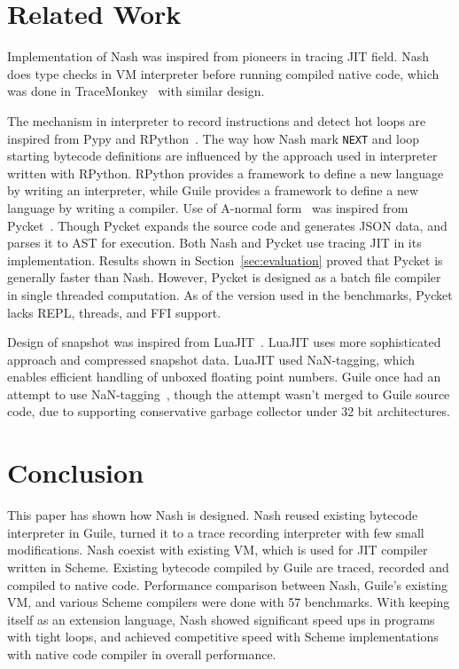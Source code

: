 \documentclass[preprint, 10pt]{sigplanconf}
\begin{document}
\section{Related Work}
\label{sec:related}
Implementation of Nash was inspired from pioneers in tracing JIT field. Nash
does type checks in VM interpreter before running compiled native code, which
was done in TraceMonkey~\cite{gal2009trace} with similar design.

The mechanism in interpreter to record instructions and detect hot loops are
inspired from Pypy and RPython~\cite{bolz2009tracing}. The way how Nash mark
\texttt{NEXT} and loop starting bytecode definitions are influenced by the
approach used in interpreter written with RPython.  RPython provides a
framework to define a new language by writing an interpreter, while Guile
provides a framework to define a new language by writing a compiler.  Use of
A-normal form~\cite{flanagan1993essence} was inspired from
Pycket~\cite{bauman2015pycket}. Though Pycket expands the source code and
generates JSON data, and parses it to AST for execution. Both Nash and Pycket
use tracing JIT in its implementation. Results shown in
Section~\ref{sec:evaluation} proved that Pycket is generally faster than Nash.
However, Pycket is designed as a batch file compiler in single threaded
computation. As of the version used in the benchmarks, Pycket lacks REPL,
threads, and FFI support.

Design of snapshot was inspired from LuaJIT~\cite{pall2009ip}. LuaJIT uses
more sophisticated approach and compressed snapshot data. LuaJIT used
NaN-tagging, which enables efficient handling of unboxed floating point
numbers. Guile once had an attempt to use NaN-tagging~\cite{wingo2011value},
though the attempt wasn't merged to Guile source code, due to supporting
conservative garbage collector under 32 bit architectures.

\section{Conclusion}
\label{sec:conclusion}
This paper has shown how Nash is designed. Nash reused existing bytecode
interpreter in Guile, turned it to a trace recording interpreter with few
small modifications. Nash coexist with existing VM, which is used for JIT
compiler written in Scheme. Existing bytecode compiled by Guile are traced,
recorded and compiled to native code. Performance comparison between Nash,
Guile's existing VM, and various Scheme compilers were done with 57
benchmarks. With keeping itself as an extension language, Nash showed
significant speed ups in programs with tight loops, and achieved competitive
speed with Scheme implementations with native code compiler in overall
performance.
\end{document}
